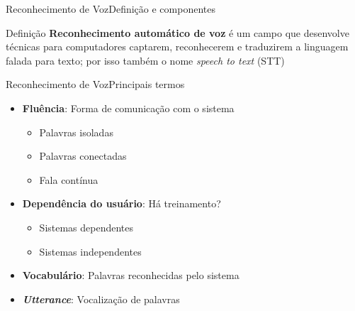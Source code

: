 \begin{frame}{Reconhecimento de Voz}{Definição e componentes}

\begin{block}{Definição}
\textbf{Reconhecimento automático de voz} é um campo que desenvolve técnicas para computadores captarem, reconhecerem e traduzirem a linguagem falada para texto; por isso também o nome \textit{speech to text} (STT)
\end{block}


\end{frame}


\begin{frame}{Reconhecimento de Voz}{Principais termos}

\begin{itemize}
\item \textbf{Fluência}: Forma de comunicação com o sistema
\begin{itemize}
  \item Palavras isoladas
  \item Palavras conectadas
  \item Fala contínua
\end{itemize}

\item<2-> \textbf{Dependência do usuário}: Há treinamento?
\begin{itemize}
  \item Sistemas dependentes
  \item Sistemas independentes
\end{itemize}

\item<3-> \textbf{Vocabulário}: Palavras reconhecidas pelo sistema

\item<4-> \textbf{\textit{Utterance}}: Vocalização de palavras
\end{itemize}
\end{frame}
